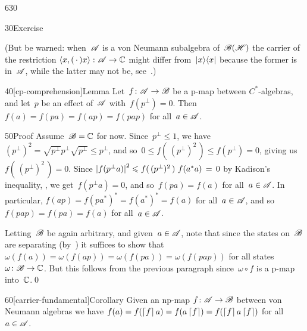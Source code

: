 \begin{parsec}{630}
\begin{point}{30}{Exercise}
\begin{enumerate}
(But be warned: when~$\scrA$ is a von Neumann subalgebra of~$\scrB(\scrH)$
the carrier of the restriction 
$\left<x,(\,\cdot\,)x\right>\colon \scrA\to\C$
might differ from~$\ketbra{x}{x}$ because the former is in~$\scrA$,
while the latter may not be, see~.)
\end{enumerate}
\end{point}
\begin{point}{40}[cp-comprehension]{Lemma}%
Let~$f\colon \scrA\to\scrB$ be a p-map between
$C^*$-algebras,
and let~$p$ be an effect of~$\scrA$ with~$f(p^\perp)=0$.
Then $f(a)=f(pa)=f(ap)=f(pap)$
for all~$a\in\scrA$.
\begin{point}{50}{Proof}%
Assume~$\scrB=\C$ for now.
Since~$p^\perp \leq 1$,
we have $(p^\perp)^2=\sqrt{p^\perp}p^\perp \sqrt{p^\perp}
\leq p^\perp$,
and so~$0\leq f(\,(p^\perp)^2\,) \leq f(p^\perp) = 0$,
giving us $f(\,(p^\perp)^2\,)=0$.
Since
$\left|\smash{f(p^\perp a)}\right|^2
\leq f(\,(p^\perp)^2\,)\  f(a^*a)\,=\, 0$
by Kadison's inequality, , 
we get~$f(p^\perp a)=0$, and so~$f(pa)=f(a)$ for all~$a\in\scrA$.
In particular,
$f(ap)=f(pa^*)^*=f(a^*)^*=f(a)$
for all~$a\in\scrA$,
and so~$f(pap)=f(pa)=f(a)$
for all~$a\in \scrA$.

Letting~$\scrB$ be again arbitrary,
and given~$a\in\scrA$,
note that
since the states on~$\scrB$ 
are separating (by~)
it suffices 
to show that $\omega(f(a))=\omega(f(ap))=\omega(f(pa))=
\omega(f(pap))$ for all
states $\omega \colon \scrB\to\C$.
But this follows from the previous paragraph
since~$\omega\circ f$
is a p-map into~$\C$.\qed
\end{point}
\end{point}
\begin{point}{60}[carrier-fundamental]{Corollary}%
Given an np-map $f\colon \scrA\to\scrB$
between von Neumann algebras
we have $f(a)=f(\ceil{f}a) = f(a\ceil{f})=f(\ceil{f}a\ceil{f})$
for all~$a\in\scrA$.
\end{point}
\end{parsec}
